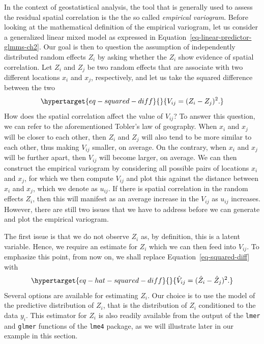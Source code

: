 \documentclass[
  letterpaper,
]{krantz}
\begin{document}
In the context of geostatistical analysis, the tool that is generally
used to assess the residual spatial correlation is the the so called
\emph{empirical variogram}. Before looking at the mathematical
definition of the empirical variogram, let us consider a generalized
linear mixed model as expressed in
Equation~\ref{eq-linear-predictor-glmms-ch2}. Our goal is then to
question the assumption of independently distributed random effects
\(Z_i\) by asking whether the \(Z_i\) show evidence of spatial
correlation. Let \(Z_i\) and \(Z_j\) be two random effects that are
associate with two different locations \(x_i\) and \(x_j\),
respectively, and let us take the squared difference between the two
\begin{equation}\protect\hypertarget{eq-squared-diff}{}{
V_{ij} = (Z_i - Z_j)^2.
}\label{eq-squared-diff}\end{equation} How does the spatial correlation
affect the value of \(V_{ij}\)? To answer this question, we can refer to
the aforementioned Tobler's law of geography. When \(x_i\) and \(x_j\)
will be closer to each other, then \(Z_i\) and \(Z_j\) will also tend to
be more similar to each other, thus making \(V_{ij}\) smaller, on
average. On the contrary, when \(x_i\) and \(x_j\) will be further
apart, then \(V_{ij}\) will become larger, on average. We can then
construct the empirical variogram by considering all possible pairs of
locations \(x_i\) and \(x_j\), for which we then compute \(V_{ij}\) and
plot this against the distance between \(x_i\) and \(x_j\), which we
denote as \(u_{ij}\). If there is spatial correlation in the random
effects \(Z_i\), then this will manifest as an average increase in the
\(V_{ij}\) as \(u_{ij}\) increases. However, there are still two issues
that we have to address before we can generate and plot the empirical
variogram.

The first issue is that we do not observe \(Z_i\) as, by definition,
this is a latent variable. Hence, we require an estimate for \(Z_i\)
which we can then feed into \(V_{ij}\). To emphasize this point, from
now on, we shall replace Equation~\ref{eq-squared-diff} with
\begin{equation}\protect\hypertarget{eq-hat-squared-diff}{}{
\hat{V}_{ij} = (\hat{Z}_{i} - \hat{Z}_j)^2.
}\label{eq-hat-squared-diff}\end{equation} Several options are available
for estimating \(Z_{i}\). Our choice is to use the model of the
predictive distribution of \(Z_i\), that is the distribution of
\(Z_{i}\) conditioned to the data \(y_i\). This estimator for \(Z_i\) is
also readily available from the output of the \texttt{lmer} and
\texttt{glmer} functions of the \texttt{lme4} package, as we will
illustrate later in our example in this section.
\end{document}
